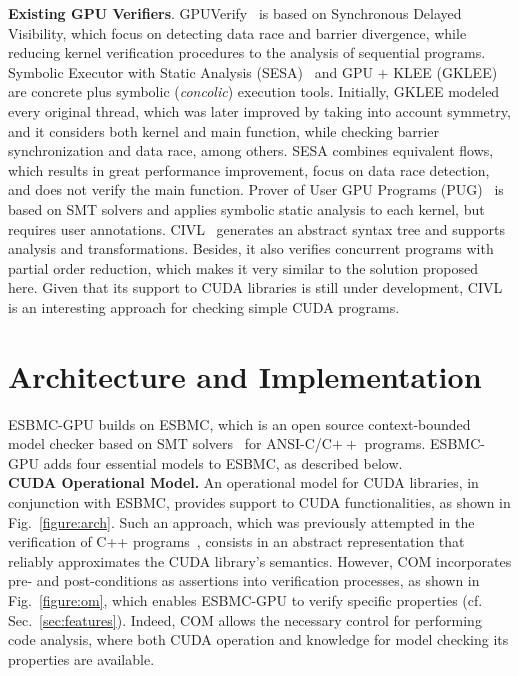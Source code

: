 \documentclass{llncs}
\begin{document}
\textbf{Existing GPU Verifiers}. GPUVerify~\cite{betts:2012} is based on Synchronous Delayed Visibility, which focus on detecting data race and barrier divergence, while reducing kernel verification procedures to the analysis of sequential programs. Symbolic Executor with Static Analysis (SESA)~\cite{sesa:2014} and GPU + KLEE (GKLEE)~\cite{Li:2012} are concrete plus symbolic (\textit{concolic}) execution tools. Initially, GKLEE modeled every original thread, which was later improved by taking into account symmetry, and it considers both kernel and main function, while checking barrier synchronization and data race, among others. SESA combines equivalent flows, which results in great performance improvement, focus on data race detection, and does not verify the main function. Prover of User GPU Programs (PUG)~\cite{Li:2010} is based on SMT solvers and applies symbolic static analysis to each kernel, but requires user annotations. CIVL~\cite{civl:2015} generates an abstract syntax tree and supports analysis and transformations. Besides, it also verifies concurrent programs with partial order reduction, which makes it very similar to the solution proposed here. Given that its support to CUDA libraries is still under development, CIVL is an interesting approach for checking simple CUDA programs.

\section{Architecture and Implementation}
\label{sec:arch}

ESBMC-GPU builds on ESBMC, which is an open source context-bounded model checker based on SMT solvers~\cite{cordeiro:2012} for ANSI-C/C$++$ programs. ESBMC-GPU adds four essential models to ESBMC, as described below.\\

\noindent \textbf{CUDA Operational Model.} An operational model for CUDA libraries, in conjunction with ESBMC, provides support to CUDA functionalities, as shown in Fig.~\ref{figure:arch}. Such an approach, which was previously attempted in the verification of C++ programs~\cite{ramalho:2013,garcia:2016}, consists in an abstract representation that reliably approximates the CUDA library's semantics. However, COM incorporates pre- and post-conditions as assertions into verification processes, as shown in Fig.~\ref{figure:om}, which enables ESBMC-GPU to verify specific properties (cf. Sec.~\ref{sec:features}). Indeed, COM allows the necessary control for performing code analysis, where both CUDA operation and knowledge for model checking its properties are available.
\end{document}
